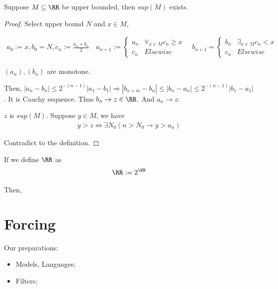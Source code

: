 \documentclass[Total.tex]{subfiles}
\begin{document}
				\begin{lemma}
					Suppose $M\subseteq \RR$ be upper bounded, then $sup(M)$ exists. 
				\end{lemma}
				\begin{proof}
					Select upper bound $N$ and $x\in M$,
					
					\begin{gather*}
						a_0:=x,b_0=N,c_n:=\frac{a_n+b_n}{2}\quad
						a_{n+1}:=\begin{cases}
							a_n&\forall_{x\in M} c_{n}\geq x\\
							c_{n}&Elsewise
						\end{cases}\quad b_{n+1}=\begin{cases}
							b_n&\exists_{x\in M} c_n<x\\
							c_n&Elsewise 
						\end{cases}
					\end{gather*}
					
					$(a_n),(b_n)$ are monotone.
					
					Then, $|a_n-b_n|\leq 2^{-(n-1)}|a_1-b_1|\Rightarrow|b_{n+m}-b_n|\leq |b_n-a_n|\leq 2^{-(n-1)} |b_1-a_1|$. It is Cauchy sequence. Thus $b_n\rightarrow z\in \RR$. And $a_n\rightarrow z$: 
					
					$z$ is $sup(M)$. Suppose $y\in M$, we have
					\begin{gather*}
						y>z\Leftrightarrow \exists N_0(n>N_0\rightarrow y>a_n)
					\end{gather*}
					
					Contradict to the definition.
				\end{proof}
				
				\begin{lemma}
					If we define $\RR$ as
					\begin{gather*}
						\RR:=2^\NN
					\end{gather*}
					
					Then, 
				\end{lemma}
					
		\chapter{Forcing}
		
			Our preparations:
			\begin{itemize}
				\item Models, Languages;
				\item Filters;
			\end{itemize}
			
\end{document}
